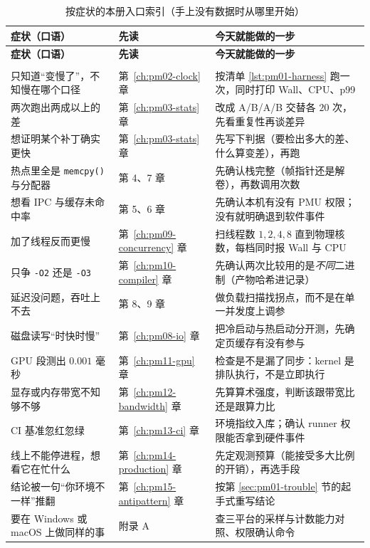 \documentclass[12pt,a4paper,fontset=fandol]{ctexbook}
\newcommand{\Fn}[1]{\texttt{#1()}}
\newcommand{\Tp}[1]{\texttt{#1}}
\newcommand{\Lang}[1]{\textsf{#1}}
\newcommand{\MWall}{\Lang{Wall}}
\newcommand{\MCpu}{\Lang{CPU}}
\newcommand{\Mx}[1]{\textsf{#1}}
\begin{document}
\begin{longtable}{>{\raggedright\arraybackslash}p{}
                  >{\raggedright\arraybackslash}p{}
                  >{\raggedright\arraybackslash}p{}}
\caption{按症状的本册入口索引（手上没有数据时从哪里开始）}\label{tab:pm01-entry}\\
\toprule
\textbf{症状（口语）} & \textbf{先读} & \textbf{今天就能做的一步}\\
\midrule
\endfirsthead
\toprule
\textbf{症状（口语）} & \textbf{先读} & \textbf{今天就能做的一步}\\
\midrule
\endhead
\midrule
\multicolumn{3}{r}{\footnotesize 接下页}\\
\endfoot
\bottomrule
\endlastfoot
只知道``变慢了''，不知慢在哪个口径 &
第~\ref{ch:pm02-clock} 章 &
按清单 \ref{lst:pm01-harness} 跑一次，同时打印 \MWall、\MCpu、\Mx{p99}\\
两次跑出两成以上的差 &
第~\ref{ch:pm03-stats} 章 &
改成 A/B/A/B 交替各 $20$ 次，先看重复性再谈差异\\
想证明某个补丁确实更快 &
第~\ref{ch:pm03-stats} 章 &
先写下判据（要检出多大的差、什么算变差），再跑\\
热点里全是 \Fn{memcpy} 与分配器 &
第 4、7 章 &
先确认栈完整（帧指针还是解卷），再数调用次数\\
想看 \Mx{IPC} 与缓存未命中率 &
第 5、6 章 &
先确认本机有没有 PMU 权限；没有就明确退到软件事件\\
加了线程反而更慢 &
第~\ref{ch:pm09-concurrency} 章 &
扫线程数 $1,2,4,8$ 直到物理核数，每档同时报 \MWall{} 与 \MCpu\\
只争 \Tp{-O2} 还是 \Tp{-O3} &
第~\ref{ch:pm10-compiler} 章 &
先确认两次比较用的是\emph{不同}二进制（产物哈希进记录）\\
延迟没问题，吞吐上不去 &
第 8、9 章 &
做负载扫描找拐点，而不是在单一并发度上调参\\
磁盘读写``时快时慢'' &
第~\ref{ch:pm08-io} 章 &
把冷启动与热启动分开测，先确定页缓存有没有参与\\
GPU 段测出 $0.001$ 毫秒 &
第~\ref{ch:pm11-gpu} 章 &
检查是不是漏了同步：kernel 是排队执行，不是立即执行\\
显存或内存带宽不知够不够 &
第~\ref{ch:pm12-bandwidth} 章 &
先算算术强度，判断该跟带宽比还是跟算力比\\
CI 基准忽红忽绿 &
第~\ref{ch:pm13-ci} 章 &
环境指纹入库；确认 runner 权限能否拿到硬件事件\\
线上不能停进程，想看它在忙什么 &
第~\ref{ch:pm14-production} 章 &
先定观测预算（能接受多大比例的开销），再选手段\\
结论被一句``你环境不一样''推翻 &
第~\ref{ch:pm15-antipattern} 章 &
按第 \ref{sec:pm01-trouble} 节的起手式重写结论\\
要在 Windows 或 macOS 上做同样的事 &
附录 A &
查三平台的采样与计数能力对照、权限确认命令\\
\end{longtable}
\end{document}
